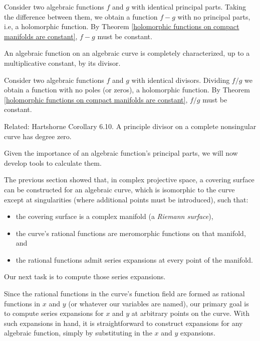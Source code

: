 \proof

Consider two algebraic functions $f$ and $g$ with identical principal
parts.  Taking the difference between them, we obtain a function $f-g$
with no principal parts, i.e, a holomorphic function.  By
Theorem \ref{holomorphic functions on compact manifolds are constant},
$f-g$ must be constant.

\endtheorem

\theorem
\label{algebraic functions are characterized by their divisors}

An algebraic function on an algebraic curve is completely characterized, up to a multiplicative
constant, by its divisor.

\proof

Consider two algebraic functions $f$ and $g$ with identical divisors.
Dividing $f/g$ we obtain a function with no poles (or zeros),
a holomorphic function.  By
Theorem \ref{holomorphic functions on compact manifolds are constant},
$f/g$ must be constant.

\endtheorem

Related: Hartshorne Corollary 6.10. A principle divisor on a complete
nonsingular curve has degree zero.

Given the importance of an algebraic function's principal parts, we will
now develop tools to calculate them.

\vfill\eject


The previous section showed that, in complex projective space,
a covering surface can be constructed for an algebraic curve,
which is isomorphic to the curve except at singularities
(where additional points must be introduced), such that:
\begin{itemize}
\item the covering surface is a complex manifold (a {\it Riemann surface}),
\item the curve's rational functions are meromorphic functions
on that manifold, and
\item the rational functions admit series expansions at
every point of the manifold.
\end{itemize}

Our next task is to compute those series expansions.

Since the rational functions in the curve's function field are
formed as rational functions in $x$ and $y$ (or whatever our
variables are named), our primary goal is to compute
series expansions for $x$ and $y$ at arbitrary points on the curve.  With such
expansions in hand, it is straightforward to construct expansions for
any algebraic function, simply by substituting in the $x$ and $y$ expansions.

